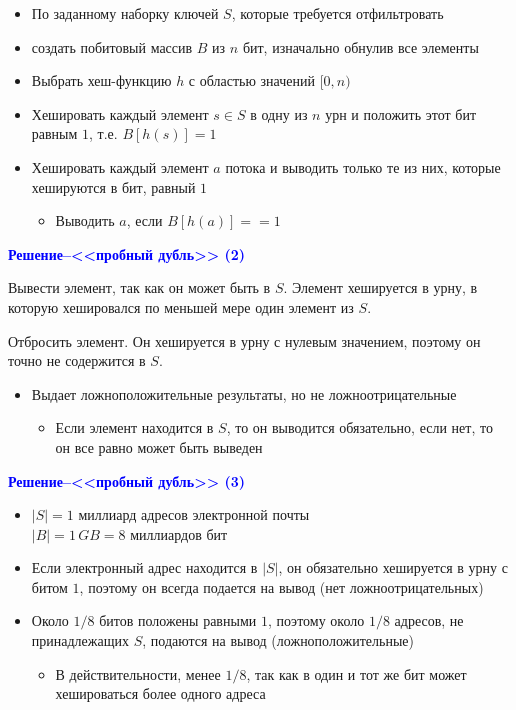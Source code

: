 \documentclass[landscape]{slides}
\begin{document}
\begin{normalsize}
\begin{slide}
\begin{itemize}
\item По заданному наборку ключей $S$, которые требуется отфильтровать
\item создать побитовый массив $B$ из $n$ бит, изначально обнулив все элементы
\item Выбрать хеш-функцию $h$ с областью значений $[0,n)$
\item Хешировать каждый элемент $s\in S$ в одну из $n$ урн и положить этот бит равным $1$, т.е. $B[h(s)]=1$
\item Хешировать каждый элемент $a$ потока и выводить только те из них, которые хешируются в бит, равный $1$
  \begin{itemize}
  \item Выводить $a$, если $B[h(a)] == 1$
  \end{itemize}
\end{itemize}
\end{slide}


\begin{slide}
\textbf{\textcolor{blue}{Решение--<<пробный дубль>> (2)}}

Вывести элемент, так как он может быть в $S$.
Элемент хешируется в урну, в которую хешировался
по меньшей мере один элемент из $S$.

Отбросить элемент. Он хешируется в урну с нулевым значением,
поэтому он точно не содержится в $S$.

\begin{itemize}
\item Выдает ложноположительные результаты, но не ложноотрицательные
  \begin{itemize}
  \item Если элемент находится в $S$, то он выводится обязательно, если нет, то он все равно может быть выведен
  \end{itemize}
\end{itemize}
\end{slide}


\begin{slide}
\textbf{\textcolor{blue}{Решение--<<пробный дубль>> (3)}}

\begin{itemize}
\item $|S| = 1$ миллиард адресов электронной почты \\
      $|B| = 1\,GB = 8$ миллиардов бит
\item Если электронный адрес находится в $|S|$, он обязательно хешируется в урну с битом $1$, поэтому он всегда подается на вывод
(нет ложноотрицательных)
\item Около $1/8$ битов положены равными $1$, поэтому около $1/8$
адресов, не принадлежащих $S$, подаются на вывод (ложноположительные)
  \begin{itemize}
  \item В действительности, менее $1/8$, так как в один и тот же бит может хешироваться более одного адреса 
  \end{itemize}
\end{itemize}
\end{slide}



\end{normalsize}
\end{document}
